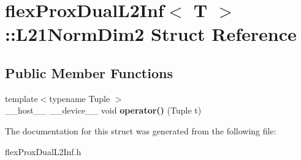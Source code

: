 \hypertarget{structflex_prox_dual_l2_inf_1_1_l21_norm_dim2}{}\section{flex\+Prox\+Dual\+L2\+Inf$<$ T $>$\+:\+:L21\+Norm\+Dim2 Struct Reference}
\label{structflex_prox_dual_l2_inf_1_1_l21_norm_dim2}
\subsection*{Public Member Functions}
\begin{DoxyCompactItemize}
\item 
\mbox{\label{structflex_prox_dual_l2_inf_1_1_l21_norm_dim2_a9ba1b9bae488b5669f96f5eb9c66d7de}} 
{\footnotesize template$<$typename Tuple $>$ }\\\+\_\+\+\_\+host\+\_\+\+\_\+ \+\_\+\+\_\+device\+\_\+\+\_\+ void {\bfseries operator()} (Tuple t)
\end{DoxyCompactItemize}


The documentation for this struct was generated from the following file\+:\begin{DoxyCompactItemize}
\item 
flex\+Prox\+Dual\+L2\+Inf.\+h\end{DoxyCompactItemize}
